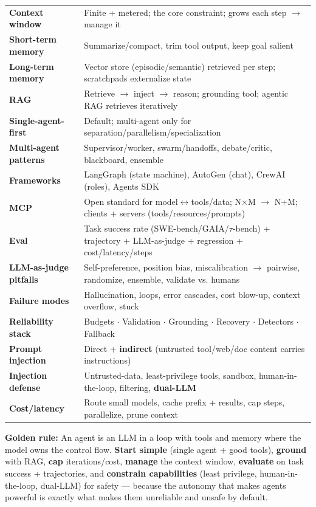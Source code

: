 \documentclass[11pt]{article}
\begin{document}
\begin{longtable}[]{@{}
  >{\raggedright\arraybackslash}p{}
  >{\raggedright\arraybackslash}p{}@{}}
\textbf{Context window} & Finite + metered; the core constraint; grows each step \(\rightarrow\) manage it \\
\textbf{Short-term memory} & Summarize/compact, trim tool output, keep goal salient \\
\rowcolor{zebra}
\textbf{Long-term memory} & Vector store (episodic/semantic) retrieved per step; scratchpads externalize state \\
\textbf{RAG} & Retrieve \(\rightarrow\) inject \(\rightarrow\) reason; grounding tool; agentic RAG retrieves iteratively \\
\rowcolor{zebra}
\textbf{Single-agent-first} & Default; multi-agent only for separation/parallelism/specialization \\
\textbf{Multi-agent patterns} & Supervisor/worker, swarm/handoffs, debate/critic, blackboard, ensemble \\
\rowcolor{zebra}
\textbf{Frameworks} & LangGraph (state machine), AutoGen (chat), CrewAI (roles), Agents SDK \\
\textbf{MCP} & Open standard for model\(\leftrightarrow\)tools/data; N\(\times\)M \(\rightarrow\) N+M; clients + servers (tools/resources/prompts) \\
\rowcolor{zebra}
\textbf{Eval} & Task success rate (SWE-bench/GAIA/\(\tau\)-bench) + trajectory + LLM-as-judge + regression + cost/latency/steps \\
\textbf{LLM-as-judge pitfalls} & Self-preference, position bias, miscalibration \(\rightarrow\) pairwise, randomize, ensemble, validate vs. humans \\
\rowcolor{zebra}
\textbf{Failure modes} & Hallucination, loops, error cascades, cost blow-up, context overflow, stuck \\
\textbf{Reliability stack} & Budgets \(\cdot\) Validation \(\cdot\) Grounding \(\cdot\) Recovery \(\cdot\) Detectors \(\cdot\) Fallback \\
\rowcolor{zebra}
\textbf{Prompt injection} & Direct + \textbf{indirect} (untrusted tool/web/doc content carries instructions) \\
\textbf{Injection defense} & Untrusted-data, least-privilege tools, sandbox, human-in-the-loop, filtering, \textbf{dual-LLM} \\
\rowcolor{zebra}
\textbf{Cost/latency} & Route small models, cache prefix + results, cap steps, parallelize, prune context \\
\end{longtable}

\textbf{Golden rule:} An agent is an LLM in a loop with tools and memory where the model owns the control flow. \textbf{Start simple} (single agent + good tools), \textbf{ground} with RAG, \textbf{cap} iterations/cost, \textbf{manage} the context window, \textbf{evaluate} on task success + trajectories, and \textbf{constrain capabilities} (least privilege, human-in-the-loop, dual-LLM) for safety --- because the autonomy that makes agents powerful is exactly what makes them unreliable and unsafe by default.
\end{document}
